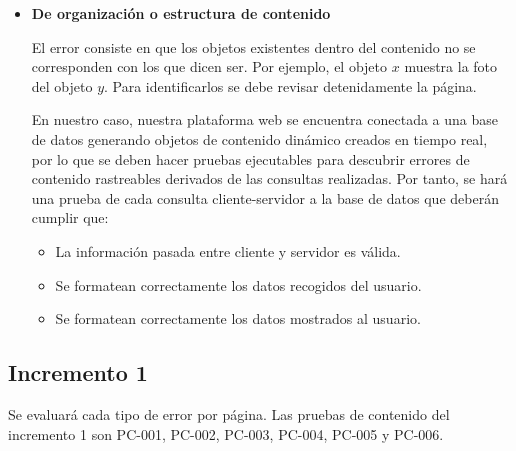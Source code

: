 \begin{itemize}
\begin{itemize}
\end{itemize}

	

\item \textbf{De organización o estructura de contenido}


El error consiste en que los objetos existentes dentro del contenido no se corresponden con los que dicen ser. Por ejemplo, el objeto $x$ muestra la foto del objeto $y$.
Para identificarlos se debe revisar detenidamente la página.



En nuestro caso, nuestra plataforma web se encuentra conectada a una base de datos generando objetos de contenido dinámico creados en tiempo real, por lo que se deben hacer pruebas ejecutables para descubrir errores de contenido rastreables derivados de las consultas realizadas. Por tanto, se hará una prueba de cada consulta cliente-servidor a la base de datos que deberán cumplir que:
\begin{itemize}
\item La información pasada entre cliente y servidor es válida.
\item Se formatean correctamente los datos recogidos del usuario.
\item Se formatean correctamente los datos mostrados al usuario.
\end{itemize}

\end{itemize}


\subsection{Incremento 1}


Se evaluará cada tipo de error por página. Las pruebas de contenido del incremento 1 son PC-001, PC-002, PC-003, PC-004, PC-005 y PC-006.

